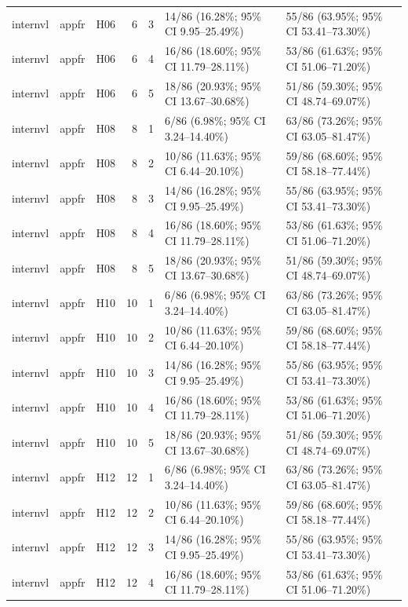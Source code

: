 \begin{longtable}{lllrrll}
internvl & appfr & H06 & 6 & 3 & 14/86 (16.28\%; 95\% CI 9.95–25.49\%) & 55/86 (63.95\%; 95\% CI 53.41–73.30\%) \\
internvl & appfr & H06 & 6 & 4 & 16/86 (18.60\%; 95\% CI 11.79–28.11\%) & 53/86 (61.63\%; 95\% CI 51.06–71.20\%) \\
internvl & appfr & H06 & 6 & 5 & 18/86 (20.93\%; 95\% CI 13.67–30.68\%) & 51/86 (59.30\%; 95\% CI 48.74–69.07\%) \\
internvl & appfr & H08 & 8 & 1 & 6/86 (6.98\%; 95\% CI 3.24–14.40\%) & 63/86 (73.26\%; 95\% CI 63.05–81.47\%) \\
internvl & appfr & H08 & 8 & 2 & 10/86 (11.63\%; 95\% CI 6.44–20.10\%) & 59/86 (68.60\%; 95\% CI 58.18–77.44\%) \\
internvl & appfr & H08 & 8 & 3 & 14/86 (16.28\%; 95\% CI 9.95–25.49\%) & 55/86 (63.95\%; 95\% CI 53.41–73.30\%) \\
internvl & appfr & H08 & 8 & 4 & 16/86 (18.60\%; 95\% CI 11.79–28.11\%) & 53/86 (61.63\%; 95\% CI 51.06–71.20\%) \\
internvl & appfr & H08 & 8 & 5 & 18/86 (20.93\%; 95\% CI 13.67–30.68\%) & 51/86 (59.30\%; 95\% CI 48.74–69.07\%) \\
internvl & appfr & H10 & 10 & 1 & 6/86 (6.98\%; 95\% CI 3.24–14.40\%) & 63/86 (73.26\%; 95\% CI 63.05–81.47\%) \\
internvl & appfr & H10 & 10 & 2 & 10/86 (11.63\%; 95\% CI 6.44–20.10\%) & 59/86 (68.60\%; 95\% CI 58.18–77.44\%) \\
internvl & appfr & H10 & 10 & 3 & 14/86 (16.28\%; 95\% CI 9.95–25.49\%) & 55/86 (63.95\%; 95\% CI 53.41–73.30\%) \\
internvl & appfr & H10 & 10 & 4 & 16/86 (18.60\%; 95\% CI 11.79–28.11\%) & 53/86 (61.63\%; 95\% CI 51.06–71.20\%) \\
internvl & appfr & H10 & 10 & 5 & 18/86 (20.93\%; 95\% CI 13.67–30.68\%) & 51/86 (59.30\%; 95\% CI 48.74–69.07\%) \\
internvl & appfr & H12 & 12 & 1 & 6/86 (6.98\%; 95\% CI 3.24–14.40\%) & 63/86 (73.26\%; 95\% CI 63.05–81.47\%) \\
internvl & appfr & H12 & 12 & 2 & 10/86 (11.63\%; 95\% CI 6.44–20.10\%) & 59/86 (68.60\%; 95\% CI 58.18–77.44\%) \\
internvl & appfr & H12 & 12 & 3 & 14/86 (16.28\%; 95\% CI 9.95–25.49\%) & 55/86 (63.95\%; 95\% CI 53.41–73.30\%) \\
internvl & appfr & H12 & 12 & 4 & 16/86 (18.60\%; 95\% CI 11.79–28.11\%) & 53/86 (61.63\%; 95\% CI 51.06–71.20\%) \\

\end{longtable}
